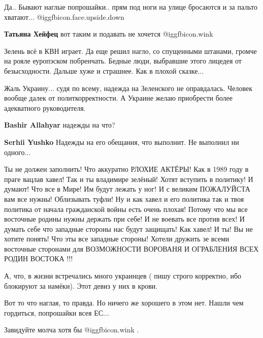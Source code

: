 \begin{itemize}
Да..
Бывают наглые попрошайки.. прям под ноги на улице бросаются и за пальто хватают... @igg{fbicon.face.upside.down} 

\begin{itemize} %
\textbf{Татьяна Хейфец} вот таким и подавать не хочется  @igg{fbicon.wink} 
\end{itemize} %


Зелень всё в КВН играет. Да еще решил нагло, со спущенными штанами, громче на
рояле еуропэском побренчать. Бедные люди, выбравшие этого лицедея от
безысходности. Дальше хуже и страшнее. Как в плохой сказке...



Жаль Украину... судя по всему, надежда на Зеленского не оправдалась. Человек
вообще далек от политкорректности. А Украине желаю приобрести более адекватного
руководителя.

\begin{itemize} %
\textbf{Bashir Allahyar} надежды на что?

\textbf{Serhii Yushko} Надежды на его обещания, что выполнит. Не выполнил ни одного...
\end{itemize} %


Ты не должен заполнить! Что аккуратно РЛОХИЕ АКТЁРЫ! Как в 1989 году в праге
вацлав хавел! Так и ты владимире зелёный! Хотят вступить в политику! И думают!
Что все в Мире! Им будут лежать у ног! И с великим ПОЖАЛУЙСТА вам все нужны!
Облизывать туфли! Ну и как хавел и его политика так и твоя политика от начала
гражданской войны есть очень плохая! Потому что мы все восточные родины нужны
держать при себе! И не воевать все против всех! И думать себе что западные
стороны нас будут защищать! Как хавел! И ты! Вы не хотите понять! Что эты все
западные стороны! Хотели дружить зе всеми восточные сторонами для ВОЗМОЖНОСТИ
ВОРОВАНЯ И ОГРАБЛЕНИЯ ВСЕХ РОДИН ВОСТОКА !!!

А, что, в жизни встречались много украинцев ( пишу строго корректно, ибо блокируют за намёки). Этот девиз у них в крови.

Вот то что наглая, то правда. Но ничего же хорошего в этом нет. Нашли чем гордиться, попрошайки всея ЕС...

Завидуйте молча хотя бы  @igg{fbicon.wink} .


\end{itemize}
